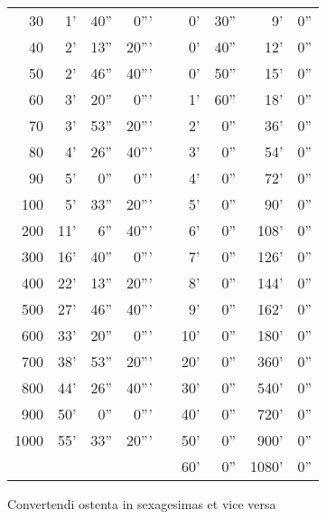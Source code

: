 \begin{tabular}{@{} r r r r  c r r r r }
  30 &  1' & 40'' &  0''' & &  0' & 30'' &    9' &   0'' \\
  40 &  2' & 13'' & 20''' & &  0' & 40'' &   12' &   0'' \\
  50 &  2' & 46'' & 40''' & &  0' & 50'' &   15' &   0'' \\
  60 &  3' & 20'' &  0''' & &  1' & 60'' &   18' &   0'' \\
  70 &  3' & 53'' & 20''' & &  2' &  0'' &   36' &   0'' \\
  80 &  4' & 26'' & 40''' & &  3' &  0'' &   54' &   0'' \\
  90 &  5' &  0'' &  0''' & &  4' &  0'' &   72' &   0'' \\
 100 &  5' & 33'' & 20''' & &  5' &  0'' &   90' &   0'' \\
 200 & 11' &  6'' & 40''' & &  6' &  0'' &  108' &   0'' \\
 300 & 16' & 40'' &  0''' & &  7' &  0'' &  126' &   0'' \\
 400 & 22' & 13'' & 20''' & &  8' &  0'' &  144' &   0'' \\
 500 & 27' & 46'' & 40''' & &  9' &  0'' &  162' &   0'' \\
 600 & 33' & 20'' &  0''' & & 10' &  0'' &  180' &   0'' \\
 700 & 38' & 53'' & 20''' & & 20' &  0'' &  360' &   0'' \\
 800 & 44' & 26'' & 40''' & & 30' &  0'' &  540' &   0'' \\
 900 & 50' &  0'' &  0''' & & 40' &  0'' &  720' &   0'' \\
1000 & 55' & 33'' & 20''' & & 50' &  0'' &  900' &   0'' \\
\multicolumn{4}{c}{}      & & 60' &  0'' & 1080' &   0'' \\
\bottomrule
\end{tabular}
%
\caption{Convertendi ostenta in sexagesimas et vice versa}
\label{tab:p006}
